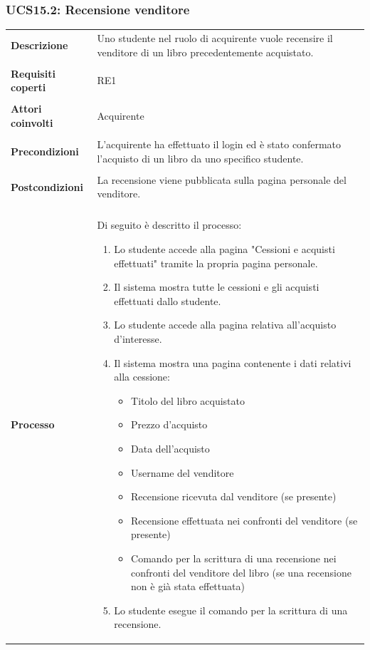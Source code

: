 \documentclass[10pt,a4paper]{report}
\begin{document}
	\subsubsection{UCS15.2: Recensione venditore}
	\begin{tabular}{lp{}}
		\textbf{Descrizione}&Uno studente nel ruolo di acquirente vuole recensire il venditore di un libro precedentemente acquistato.\\
		\\
		\textbf{Requisiti coperti}&RE1\\
		\\
		\textbf{Attori coinvolti}&Acquirente\\
		\\
		\textbf{Precondizioni}&L'acquirente ha effettuato il login ed è stato confermato l'acquisto di un libro da uno specifico studente.\\
		\\
		\textbf{Postcondizioni}&La recensione viene pubblicata sulla pagina personale del venditore.\\
		\\
		\textbf{Processo}&Di seguito è descritto il processo:
		\begin{enumerate}
			\item Lo studente accede alla pagina "Cessioni e acquisti effettuati" tramite la propria pagina personale.
			\item Il sistema mostra tutte le cessioni e gli acquisti effettuati dallo studente.
			\item Lo studente accede alla pagina relativa all'acquisto d'interesse.
			\item Il sistema mostra una pagina contenente i dati relativi alla cessione:
			\begin{itemize}
				\item Titolo del libro acquistato
				\item Prezzo d'acquisto
				\item Data dell'acquisto
				\item Username del venditore
				\item Recensione ricevuta dal venditore (se presente)
				\item Recensione effettuata nei confronti del venditore (se presente)
				\item Comando per la scrittura di una recensione nei confronti del venditore del libro (se una recensione non è già stata effettuata)
			\end{itemize}
			\item Lo studente esegue il comando per la scrittura di una recensione.

\end{enumerate}
\end{tabular}
\end{document}
